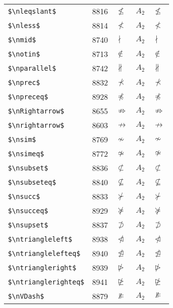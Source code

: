 \documentclass{article}
\begin{document}
\begin{table}
\begin{center}
\begin{tabular}{llll}
 \verb#$\nleqslant$#          & 8816 & $\nleqslant$          & $A_2\quad \nleqslant$\\
 \verb#$\nless$#              & 8814 & $\nless$              & $A_2\quad \nless$\\
 \verb#$\nmid$#               & 8740 & $\nmid$               & $A_2\quad \nmid$\\
 \verb#$\notin$#              & 8713 & $\notin$              & $A_2\quad \notin$\\
 \verb#$\nparallel$#          & 8742 & $\nparallel$          & $A_2\quad \nparallel$\\
 \verb#$\nprec$#              & 8832 & $\nprec$              & $A_2\quad \nprec$\\
 \verb#$\npreceq$#            & 8928 & $\npreceq$            & $A_2\quad \npreceq$\\
 \verb#$\nRightarrow$#        & 8655 & $\nRightarrow$        & $A_2\quad \nRightarrow$\\
 \verb#$\nrightarrow$#        & 8603 & $\nrightarrow$        & $A_2\quad \nrightarrow$\\
 \verb#$\nsim$#               & 8769 & $\nsim$               & $A_2\quad \nsim$\\
 \verb#$\nsimeq$#             & 8772 & $\nsimeq$             & $A_2\quad \nsimeq$\\
 \verb#$\nsubset$#            & 8836 & $\nsubset$            & $A_2\quad \nsubset$\\
 \verb#$\nsubseteq$#          & 8840 & $\nsubseteq$          & $A_2\quad \nsubseteq$\\
 \verb#$\nsucc$#              & 8833 & $\nsucc$              & $A_2\quad \nsucc$\\
 \verb#$\nsucceq$#            & 8929 & $\nsucceq$            & $A_2\quad \nsucceq$\\
 \verb#$\nsupset$#            & 8837 & $\nsupset$            & $A_2\quad \nsupset$\\
 \verb#$\ntriangleleft$#      & 8938 & $\ntriangleleft$      & $A_2\quad \ntriangleleft$\\
 \verb#$\ntrianglelefteq$#    & 8940 & $\ntrianglelefteq$    & $A_2\quad \ntrianglelefteq$\\
 \verb#$\ntriangleright$#     & 8939 & $\ntriangleright$     & $A_2\quad \ntriangleright$\\
 \verb#$\ntrianglerighteq$#   & 8941 & $\ntrianglerighteq$   & $A_2\quad \ntrianglerighteq$\\
 \verb#$\nVDash$#             & 8879 & $\nVDash$             & $A_2\quad \nVDash$\\

\end{tabular}
\end{center}
\end{table}
\end{document}
